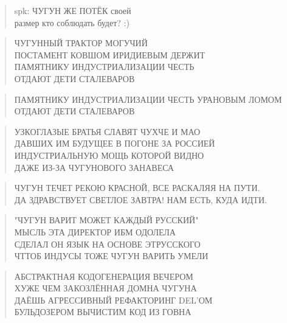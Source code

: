 \poemtitle{***}
\begin{verse}
spk: ЧУГУН ЖЕ ПОТЁК своей\\
размер кто соблюдать будет? :)
\end{verse}

\poemtitle{***}
\begin{verse}
ЧУГУННЫЙ ТРАКТОР МОГУЧИЙ\\
ПОСТАМЕНТ КОВШОМ ИРИДИЕВЫМ ДЕРЖИТ\\
ПАМЯТНИКУ ИНДУСТРИАЛИЗАЦИИ ЧЕСТЬ\\
ОТДАЮТ ДЕТИ СТАЛЕВАРОВ
\end{verse}

\poemtitle{***}
\begin{verse}
ПАМЯТНИКУ ИНДУСТРИАЛИЗАЦИИ ЧЕСТЬ УРАНОВЫМ ЛОМОМ\\
ОТДАЮТ ДЕТИ СТАЛЕВАРОВ
\end{verse}

\poemtitle{***}
\begin{verse}
УЗКОГЛАЗЫЕ БРАТЬЯ СЛАВЯТ ЧУХЧЕ И МАО\\
ДАВШИХ ИМ БУДУЩЕЕ В ПОГОНЕ ЗА РОССИЕЙ\\
ИНДУСТРИАЛЬНУЮ МОЩЬ КОТОРОЙ ВИДНО\\
ДАЖЕ ИЗ-ЗА ЧУГУНОВОГО ЗАНАВЕСА
\end{verse}

\poemtitle{***}
\begin{verse}
ЧУГУН ТЕЧЕТ РЕКОЮ КРАСНОЙ, ВСЕ РАСКАЛЯЯ НА ПУТИ.\\
ДА ЗДРАВСТВУЕТ СВЕТЛОЕ ЗАВТРА! НАМ ЕСТЬ, КУДА ИДТИ.
\end{verse}

\poemtitle{***}
\begin{verse}
"ЧУГУН ВАРИТ МОЖЕТ КАЖДЫЙ РУССКИЙ"\\
МЫСЛЬ ЭТА ДИРЕКТОР ИБМ ОДОЛЕЛА\\
СДЕЛАЛ ОН ЯЗЫК НА ОСНОВЕ ЭТРУССКОГО \\
ЧТТОБ ИНДУСЫ ТОЖЕ ЧУГУН ВАРИТЬ УМЕЛИ
\end{verse}

\poemtitle{***}
\begin{verse}
АБСТРАКТНАЯ КОДОГЕНЕРАЦИЯ ВЕЧЕРОМ \\
ХУЖЕ ЧЕМ ЗАКОЗЛЁННАЯ ДОМНА ЧУГУНА\\
ДАЁШЬ АГРЕССИВНЫЙ РЕФАКТОРИНГ DEL'ОМ\\
БУЛЬДОЗЕРОМ ВЫЧИСТИМ КОД ИЗ ГОВНА
\end{verse}

